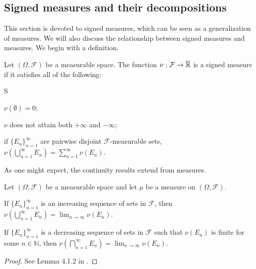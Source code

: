 \subsection{Signed measures and their decompositions}
This section is devoted to signed measures, which can be seen as a generalization of measures. We will also discuss the relationship between signed measures and measures. We begin with a definition.
\begin{definition}
Let $(\Omega, \mathcal{F})$ be a measurable space. The function $\nu : \mathcal{F} \to \overline{{\mathbb R}}$ is a signed measure if it satisfies all of the following:
\begin{axioms}{S}
  \item \label{defn:measure:smeasure:S1} $\nu(\emptyset) = 0$;
  \item \label{defn:measure:smeasure:S2} $\nu$ does not attain both $+\infty$ and $-\infty$;
  \item \label{defn:measure:smeasure:S3}  if $\{ E_n \}_{n=1}^\infty$ are pairwise disjoint $\mathcal{F}$-measurable sets, $\nu(\bigcup_{n=1}^\infty E_n) = \sum_{n=1}^\infty \nu(E_n)$.
\end{axioms}
\end{definition}
As one might expect, the continuity results extend from measures.
\begin{lemma}
Let $(\Omega, \mathcal{F})$ be a measurable space and let $\mu$ be a measure on $(\Omega, \mathcal{F})$. 
\begin{description}
\item If $\{ E_n \}_{n = 1}^{\infty}$ is an increasing sequence of sets in $\mathcal{F}$, then $\nu \left (\bigcup_{n = 1} ^ {\infty} E_n \right) = \lim_{n \to \infty} \nu(E_n)$.
\item  If $\{ E_n \}_{n = 1}^{\infty}$  is a decreasing sequence of sets in $\mathcal{F}$ such that $\nu(E_n)$ is finite for some $n \in \mathbb{N}$, then $\nu \left (\bigcap_{n = 1} ^ {\infty} E_n \right) = \lim_{n \to \infty} \nu(E_n)$.
\end{description}
\end{lemma}
\begin{proof}
See Lemma 4.1.2 in \cite{cohn_2013_measure}.
\end{proof}